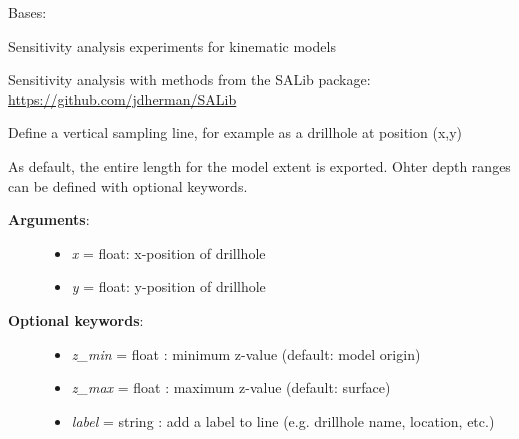 \documentclass[a4paper,10pt,english]{sphinxmanual}
\begin{document}
\begin{fulllineitems}
\label{pynoddy:pynoddy.experiment.SensitivityAnalysis.SensitivityAnalysis}
Bases: {\hyperref[pynoddy:pynoddy.experiment.Experiment]{\emph{}}}

Sensitivity analysis experiments for kinematic models

Sensitivity analysis with methods from the SALib package:
\href{https://github.com/jdherman/SALib}{https://github.com/jdherman/SALib}

\begin{fulllineitems}
\label{pynoddy:pynoddy.experiment.SensitivityAnalysis.SensitivityAnalysis.add_sampling_line}
Define a vertical sampling line, for example as a drillhole at position (x,y)

As default, the entire length for the model extent is exported. Ohter depth ranges
can be defined with optional keywords.
\begin{description}
\item[{\textbf{Arguments}:}] \leavevmode\begin{itemize}
\item {} 
\emph{x} = float: x-position of drillhole

\end{itemize}
\begin{itemize}
\item {} 
\emph{y} = float: y-position of drillhole

\end{itemize}

\item[{\textbf{Optional keywords}:}] \leavevmode\begin{itemize}
\item {} 
\emph{z\_min} = float : minimum z-value (default: model origin)

\item {} 
\emph{z\_max} = float : maximum z-value (default: surface)

\item {} 
\emph{label} = string : add a label to line (e.g. drillhole name, location, etc.)


\end{itemize}
\end{description}
\end{fulllineitems}
\end{fulllineitems}
\end{document}
